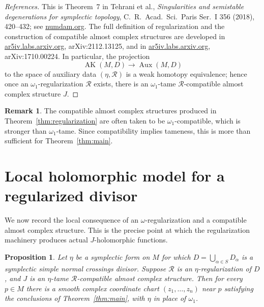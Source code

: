 \documentclass[11pt]{article}
\newtheorem{proposition}[theorem]{Proposition}
\theoremstyle{definition}
\newtheorem{remark}[theorem]{Remark}
\begin{document}
\begin{proof}[References]
This is Theorem~7 in Tehrani et al., \emph{Singularities and semistable degenerations for symplectic topology}, C.~R.~Acad.~Sci.~Paris Ser.~I 356 (2018), 420--432; see \href{https://www.numdam.org/item/10.1016/j.crma.2018.02.009.pdf}{numdam.org}.  The full definition of regularization and the construction of compatible almost complex structures are developed in \href{https://ar5iv.labs.arxiv.org/html/2112.13125}{ar5iv.labs.arxiv.org}, arXiv:2112.13125, and in \href{https://ar5iv.labs.arxiv.org/html/1710.00224}{ar5iv.labs.arxiv.org}, arXiv:1710.00224.  In particular, the projection
\[
\operatorname{AK}(M,D)\longrightarrow \operatorname{Aux}(M,D)
\]
to the space of auxiliary data \((\eta,\mathcal R)\) is a weak homotopy equivalence; hence once an \(\omega_1\)-regularization \(\mathcal R\) exists, there is an \(\omega_1\)-tame \(\mathcal R\)-compatible almost complex structure \(J\).
\end{proof}

\begin{remark}
The compatible almost complex structures produced in Theorem~\ref{thm:regularization} are often taken to be \(\omega_1\)-compatible, which is stronger than \(\omega_1\)-tame.  Since compatibility implies tameness, this is more than sufficient for Theorem~\ref{thm:main}.
\end{remark}

\section{Local holomorphic model for a regularized divisor}\label{sec:local}

We now record the local consequence of an \(\omega\)-regularization and a compatible almost complex structure.  This is the precise point at which the regularization machinery produces actual \(J\)-holomorphic functions.

\begin{proposition}\label{prop:localmodel}
Let \(\eta\) be a symplectic form on \(M\) for which \(D=\bigcup_{\alpha\in S}D_\alpha\) is a symplectic simple normal crossings divisor.  Suppose \(\mathcal R\) is an \(\eta\)-regularization of \(D\), and \(J\) is an \(\eta\)-tame \(\mathcal R\)-compatible almost complex structure.  Then for every \(p\in M\) there is a smooth complex coordinate chart \((z_1,\dots,z_n)\) near \(p\) satisfying the conclusions of Theorem~\ref{thm:main}, with \(\eta\) in place of \(\omega_1\).
\end{proposition}
\end{document}

